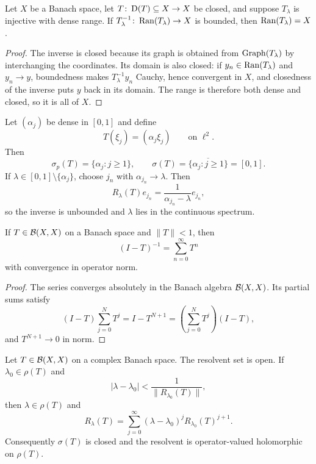 \begin{notelemma}
Let $X$ be a Banach space, let
$T\colon\operatorname{D}(T)\subseteq X\to X$ be closed, and suppose $T_\lambda$ is
injective with dense range.  If
$T_\lambda^{-1}\colon\operatorname{Ran}(T_\lambda)\to X$ is bounded, then
$\operatorname{Ran}(T_\lambda)=X$.
\end{notelemma}

\begin{proof}
The inverse is closed because its graph is obtained from
$\operatorname{Graph}(T_\lambda)$ by interchanging the coordinates.  Its domain is also
closed: if $y_n\in\operatorname{Ran}(T_\lambda)$ and $y_n\to y$, boundedness makes
$T_\lambda^{-1}y_n$ Cauchy, hence convergent in $X$, and closedness of the
inverse puts $y$ back in its domain.  The range is therefore both dense and
closed, so it is all of $X$.
\end{proof}

\begin{noteexample}
Let $(\alpha_j)$ be dense in $[0,1]$ and define
\[
  T(\xi_j)=(\alpha_j\xi_j)
  \qquad\text{on }\ell^2.
\]
Then
\[
  \sigma_p(T)=\{\alpha_j:j\ge1\},
  \qquad
  \sigma(T)=\overline{\{\alpha_j:j\ge1\}}=[0,1].
\]
If $\lambda\in[0,1]\setminus\{\alpha_j\}$, choose $j_n$ with
$\alpha_{j_n}\to\lambda$.  Then
\[
  R_\lambda(T)e_{j_n}
  =\frac1{\alpha_{j_n}-\lambda}e_{j_n},
\]
so the inverse is unbounded and $\lambda$ lies in the continuous spectrum.
\end{noteexample}

\begin{notetheorem}
If $T\in\mathcal{B}(X,X)$ on a Banach space and $\|T\|<1$, then
\[
  (I-T)^{-1}=\sum_{n=0}^{\infty}T^n
\]
with convergence in operator norm.
\end{notetheorem}

\begin{proof}
The series converges absolutely in the Banach algebra $\mathcal{B}(X,X)$.  Its
partial sums satisfy
\[
  (I-T)\sum_{j=0}^{N}T^j=I-T^{N+1}
  =\left(\sum_{j=0}^{N}T^j\right)(I-T),
\]
and $T^{N+1}\to0$ in norm.
\end{proof}

\begin{notetheorem}
Let $T\in\mathcal{B}(X,X)$ on a complex Banach space.  The resolvent set is open.
If $\lambda_0\in\rho(T)$ and
\[
  |\lambda-\lambda_0|<\frac1{\|R_{\lambda_0}(T)\|},
\]
then $\lambda\in\rho(T)$ and
\[
  R_\lambda(T)
  =\sum_{j=0}^{\infty}
     (\lambda-\lambda_0)^jR_{\lambda_0}(T)^{j+1}.
\]
Consequently $\sigma(T)$ is closed and the resolvent is operator-valued
holomorphic on $\rho(T)$.
\end{notetheorem}

